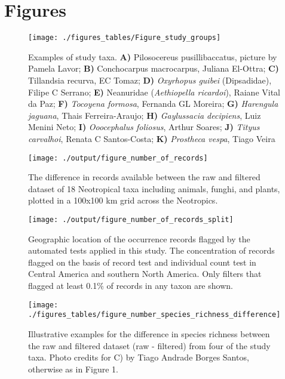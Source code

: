 \documentclass[fleqn,10pt,lineno]{wlpeerj} %
\begin{document}
\hypertarget{figures}{%
\section*{Figures}\label{figures}}

\begin{figure}
\texttt{[image: ./figures\_tables/Figure\_study\_groups]} \caption{Examples of study taxa. \textbf{A)} Pilosocereus pusillibaccatus, picture by Pamela Lavor; \textbf{B)} Conchocarpus macrocarpus, Juliana El-Ottra; \textbf{C)} Tillandsia recurva, EC Tomaz; \textbf{D)} \textit{Oxyrhopus guibei} (Dipsadidae), Filipe C Serrano; \textbf{E)} Neanuridae (\textit{Aethiopella ricardoi}), Raiane Vital da Paz; \textbf{F)} \textit{Tocoyena formosa}, Fernanda GL Moreira; \textbf{G)} \textit{Harengula jaguana}, Thais Ferreira-Araujo; \textbf{H)} \textit{Gaylussacia decipiens}, Luiz Menini Neto; \textbf{I)} \textit{Ooocephalus foliosus}, Arthur Soares; \textbf{J)} \textit{Tityus carvalhoi}, Renata C Santos-Costa; \textbf{K)} \textit{Prostheca vespa}, Tiago Veira}\label{fig:species}
\end{figure}

\begin{figure}
\texttt{[image: ./output/figure\_number\_of\_records]} \caption{The difference in records available between the raw and filtered dataset of 18 Neotropical taxa including animals, funghi, and plants, plotted in a 100x100 km grid across the Neotropics.}\label{fig:total}
\end{figure}

\begin{figure}
\texttt{[image: ./output/figure\_number\_of\_records\_split]} \caption{Geographic location of the occurrence records flagged by the automated tests applied in this study. The concentration of records flagged on the basis of record test and individual count test in Central America and southern North America.  Only filters that flagged at least 0.1\% of records in any taxon are shown.}\label{fig:split}
\end{figure}

\begin{figure}
\texttt{[image: ./figures\_tables/figure\_number\_species\_richness\_difference]} \caption{Illustrative examples for the difference in species richness between the raw and filtered dataset (raw - filtered) from four of the study taxa. Photo credits for C) by Tiago Andrade Borges Santos, otherwise as in Figure 1.}\label{fig:speciesrichness}
\end{figure}
\end{document}
